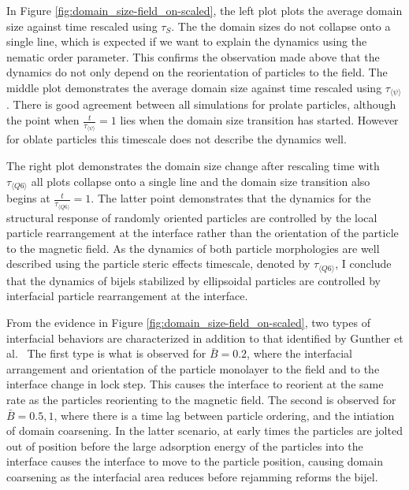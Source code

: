 In Figure \ref{fig:domain_size-field_on-scaled}, the left plot plots the
average domain size against time rescaled using $\tau_S$. The
the domain sizes do not collapse onto a single line, which is expected
if we want to explain the dynamics using the nematic order parameter.
This confirms the observation made above that the dynamics do not only
depend on the reorientation of particles to the field. The middle plot
demonstrates the average domain size against time rescaled using
$\tau_{\langle \psi \rangle}$. There is good agreement
between all simulations for prolate particles, although the point when
$\frac{t}{\tau_{\langle \psi \rangle}} = 1$ lies when the domain size
transition has started. However for oblate particles this
timescale does not describe the dynamics well.

The right plot demonstrates the domain size change after rescaling time
with $\tau_{\langle Q6 \rangle}$ all plots collapse onto a single line and 
the domain size transition also begins at
$\frac{t}{\tau_{\langle Q6 \rangle}} = 1$. The latter point
demonstrates that the dynamics for the structural response of randomly
oriented particles are controlled by the local particle rearrangement at
the interface rather than the orientation of the particle to the
magnetic field. As the dynamics of both particle morphologies are well described
using the particle steric effects timescale, denoted by $\tau_{\langle Q6 \rangle}$,
I conclude that the dynamics of bijels stabilized by ellipsoidal particles are controlled by
interfacial particle rearrangement at the interface.

From the evidence in Figure \ref{fig:domain_size-field_on-scaled}, two
types of interfacial behaviors are characterized in addition to that
identified by Gunther et al.~\cite{gunther_timescales_2014} The first
type is what is observed for $\bar{B} = 0.2$, where the interfacial
arrangement and orientation of the particle monolayer to the field and to the
interface change in lock step. This causes the interface to reorient at
the same rate as the particles reorienting to the magnetic field. The
second is observed for $\bar{B} = 0.5, 1$, where there is a time lag
between particle ordering, and the intiation of domain coarsening. In
the latter scenario, at early times the particles are jolted out of
position before the large adsorption energy of the particles into the
interface causes the interface to move to the particle position, causing
domain coarsening as the interfacial area reduces before rejamming reforms the bijel.

